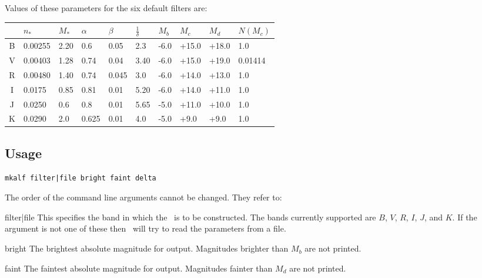 \documentclass[11pt,twoside]{article}
\begin{document}
Values of these parameters for the six default filters are:

\begin{table}[h]
\centering
\begin{tabular}{clllllllll}
  & $n_\ast$ & $M_\ast$ & $\alpha$ & $\beta$ & $\frac{1}{\delta}$ & $M_b$ & $M_c$& $M_d$ & $N(M_c)$ \\ \hline
B & 0.00255 & 2.20 & 0.6   & 0.05  & 2.3  & -6.0 & +15.0 & +18.0 & 1.0 \\ 
V & 0.00403 & 1.28 & 0.74  & 0.04  & 3.40 & -6.0 & +15.0 & +19.0 & 0.01414 \\
R & 0.00480 & 1.40 & 0.74  & 0.045 & 3.0  & -6.0 & +14.0 & +13.0 & 1.0 \\
I & 0.0175  & 0.85 & 0.81  & 0.01  & 5.20 & -6.0 & +14.0 & +11.0 & 1.0 \\
J & 0.0250  & 0.6  & 0.8   & 0.01  & 5.65 & -5.0 & +11.0 & +10.0 & 1.0 \\
K & 0.0290  & 2.0  & 0.625 & 0.01  & 4.0  & -5.0 & +9.0  & +9.0  & 1.0 \\ 
\hline
\end{tabular}
\end{table}

\subsection*{Usage}

\begin{verbatim}
mkalf filter|file bright faint delta
\end{verbatim}

\nin
The order of the command line arguments cannot be changed. They refer to:
\medskip

\begin{clo}{filter|file}
This specifies the band in which the \lf\ is to be constructed. The bands 
currently supported are $B$, $V$, $R$, $I$, $J$, and $K$. If the argument is 
not one of these then \mkalf\ will try to read the parameters from a file.
\end{clo}

\begin{clo}{bright}
The brightest absolute magnitude for output. Magnitudes brighter than $M_b$ are
not printed.
\end{clo}

\begin{clo}{faint}
The faintest absolute magnitude for output. Magnitudes fainter than $M_d$ are
not printed.
\end{clo}
\end{document}

